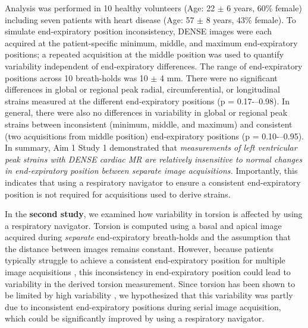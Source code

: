 	Analysis was performed in 10 healthy volunteers (Age: 22 $\pm$ 6 years, 60\% female) including seven patients with heart disease (Age: 57 $\pm$ 8 years, 43\% female). To simulate end-expiratory position inconsistency, DENSE images were each acquired at the patient-specific minimum, middle, and maximum end-expiratory positions; a repeated acquisition at the middle position was used to quantify variability independent of end-expiratory differences. The range of end-expiratory positions across 10 breath-holds was 10 $\pm$ 4 mm. There were no significant differences in global or regional peak radial, circumferential, or longitudinal strains measured at the different end-expiratory positions (p = 0.17-–0.98). In general, there were also no differences in variability in global or regional peak strains between inconsistent (minimum, middle, and maximum) and consistent (two acquisitions from middle position) end-expiratory positions (p = 0.10-–0.95). In summary, Aim 1 Study 1 demonstrated that \textit{measurements of left ventricular peak strains with DENSE cardiac MR are relatively insensitive to normal changes in end-expiratory position between separate image acquisitions.} Importantly, this indicates that using a respiratory navigator to ensure a consistent end-expiratory position is not required for acquisitions used to derive strains.

	In the \textbf{second study}, we examined how variability in torsion is affected by using a respiratory navigator. Torsion is computed using a basal and apical image acquired during \textit{separate} end-expiratory breath-holds and the assumption that the distance between images remains constant. However, because patients typically struggle to achieve a consistent end-expiratory position for multiple image acquisitions \cite{Liu1993,Wang1995a,Taylor1997a,Holland1998c,Fischer2006a}, this inconsistency in end-expiratory position could lead to variability in the derived torsion measurement. Since torsion has been shown to be limited by high variability \cite{Donekal2013a}, we hypothesized that this variability was partly due to inconsistent end-expiratory positions during serial image acquisition, which could be significantly improved by using a respiratory navigator.

